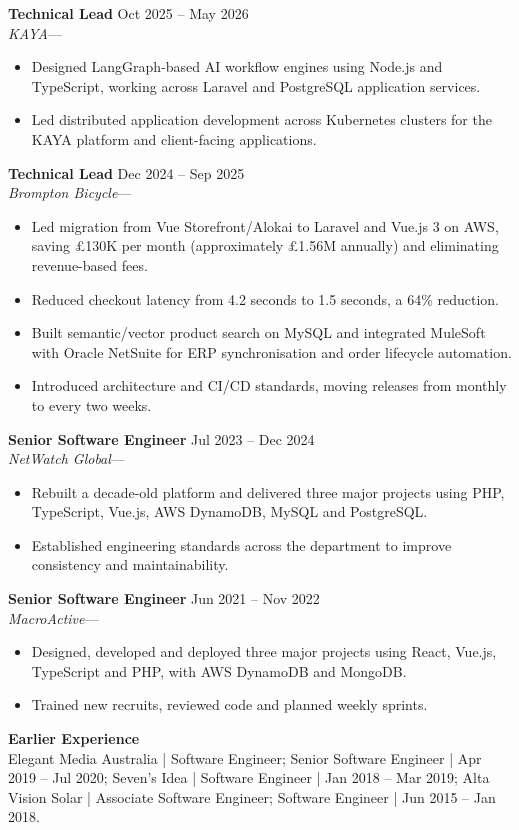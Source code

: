 \documentclass[10pt,a4paper]{article}
\newcommand{\resumeHeading}[4]{
  \textbf{#1} \hfill #3\\
  \textit{#2}\if\relax\detokenize{#4}\relax\else\enspace---\enspace#4\fi\par\vspace{1pt}
}
\begin{document}
\resumeHeading{Technical Lead}{KAYA}{Oct 2025 -- May 2026}{}
\begin{itemize}
  \item Designed LangGraph-based AI workflow engines using Node.js and TypeScript, working across Laravel and PostgreSQL application services.
  \item Led distributed application development across Kubernetes clusters for the KAYA platform and client-facing applications.
\end{itemize}

\resumeHeading{Technical Lead}{Brompton Bicycle}{Dec 2024 -- Sep 2025}{}
\begin{itemize}
  \item Led migration from Vue Storefront/Alokai to Laravel and Vue.js 3 on AWS, saving \pounds{}130K per month (approximately \pounds{}1.56M annually) and eliminating revenue-based fees.
  \item Reduced checkout latency from 4.2 seconds to 1.5 seconds, a 64\% reduction.
  \item Built semantic/vector product search on MySQL and integrated MuleSoft with Oracle NetSuite for ERP synchronisation and order lifecycle automation.
  \item Introduced architecture and CI/CD standards, moving releases from monthly to every two weeks.
\end{itemize}

\resumeHeading{Senior Software Engineer}{NetWatch Global}{Jul 2023 -- Dec 2024}{}
\begin{itemize}
  \item Rebuilt a decade-old platform and delivered three major projects using PHP, TypeScript, Vue.js, AWS DynamoDB, MySQL and PostgreSQL.
  \item Established engineering standards across the department to improve consistency and maintainability.
\end{itemize}

\resumeHeading{Senior Software Engineer}{MacroActive}{Jun 2021 -- Nov 2022}{}
\begin{itemize}
  \item Designed, developed and deployed three major projects using React, Vue.js, TypeScript and PHP, with AWS DynamoDB and MongoDB.
  \item Trained new recruits, reviewed code and planned weekly sprints.
\end{itemize}

\textbf{Earlier Experience}\\
Elegant Media Australia | Software Engineer; Senior Software Engineer | Apr 2019 -- Jul 2020; Seven's Idea | Software Engineer | Jan 2018 -- Mar 2019; Alta Vision Solar | Associate Software Engineer; Software Engineer | Jun 2015 -- Jan 2018.
\end{document}
